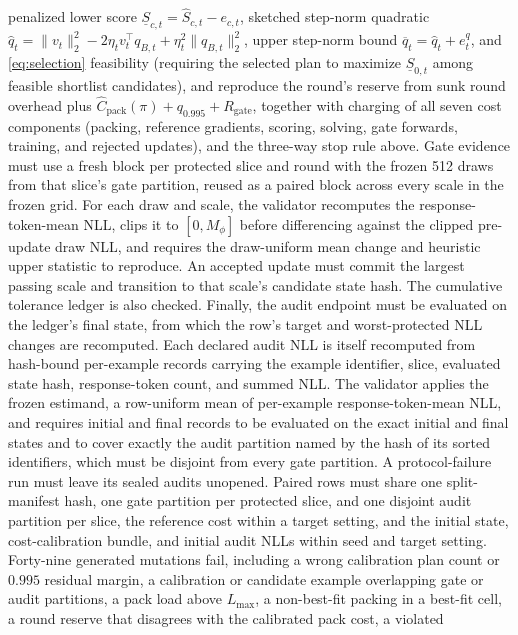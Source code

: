 \documentclass{article}
\begin{document}
penalized lower score $\underline S_{c,t}=\widehat S_{c,t}-e_{c,t}$, sketched
step-norm quadratic
$\widehat q_t=\|v_t\|_2^2-2\eta_tv_t^\top q_{B,t}+\eta_t^2\|q_{B,t}\|_2^2$, upper
step-norm bound $\overline q_t=\widehat q_t+e_t^q$, and \cref{eq:selection}
feasibility (requiring the selected plan to maximize $\underline S_{0,t}$ among
feasible shortlist candidates), and reproduce the
round's reserve from sunk round overhead plus
$\widehat C_{\mathrm{pack}}(\pi)+q_{0.995}+R_{\mathrm{gate}}$, together with
charging of all seven cost components (packing, reference gradients,
scoring, solving, gate forwards, training, and rejected updates), and the
three-way stop rule above. Gate evidence must use a fresh block per protected
slice and round with the frozen 512 draws from that slice's gate partition,
reused as a paired block across every scale in the frozen grid. For each draw
and scale, the validator recomputes the response-token-mean NLL, clips it to
$[0,M_\phi]$ before differencing against the clipped pre-update draw NLL, and
requires the draw-uniform mean change and heuristic upper statistic to
reproduce. An accepted update must commit the largest passing scale and
transition to that scale's candidate state hash. The cumulative tolerance ledger is also
checked. Finally, the audit endpoint must be evaluated on the ledger's final
state, from which the row's target and worst-protected NLL changes are
recomputed. Each declared audit NLL is itself recomputed from hash-bound
per-example records carrying the example identifier, slice, evaluated state
hash, response-token count, and summed NLL. The validator applies the frozen
estimand, a row-uniform mean of per-example response-token-mean NLL, and
requires initial and final records to be evaluated on the exact initial and
final states and to cover exactly the audit partition named by the hash of its
sorted identifiers, which must be disjoint from every gate partition. A
protocol-failure run must leave its sealed audits
unopened. Paired rows must share one split-manifest hash, one gate partition
per protected slice, and one disjoint audit partition per slice, the reference
cost within a target setting, and the initial state, cost-calibration bundle,
and initial audit NLLs within seed and target setting. Forty-nine generated
mutations fail, including a wrong calibration plan count or $0.995$ residual
margin, a calibration or candidate example overlapping gate or audit
partitions, a pack load above $L_{\max}$, a non-best-fit packing in a best-fit
cell, a round reserve that disagrees with the calibrated pack cost, a violated
\end{document}
